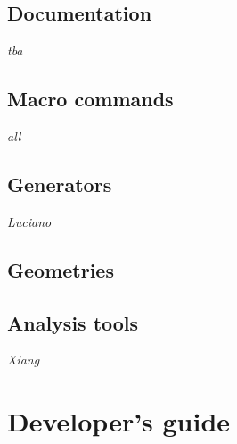 \documentclass[11pt, a4paper]{book}
\begin{document}
\chapter{Documentation} 
\label{chapter:documentation} 
{\it tba} 




\chapter{Macro commands} 
\label{chapter:macros} 
{\it all}




\chapter{Generators} 
\label{chapter:generators} 
{\it Luciano} 



\chapter{Geometries}
\label{chapter:geometries}



\chapter{Analysis tools} 
\label{chapter:tools} 
{\it Xiang} 



\part{Developer's guide} 
\label{part:developer} 

\end{document}
